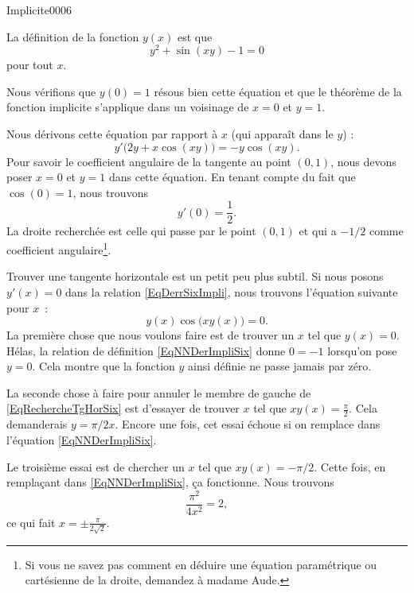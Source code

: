 
\begin{corrige}{Implicite0006}

	La définition de la fonction $y(x)$ est que 
	\begin{equation}		\label{EqNNDerImpliSix}
		y^2+\sin(xy)-1=0
	\end{equation}
	pour tout $x$.
	
	Nous vérifions que $y(0)=1$ résous bien cette équation et que le théorème de la fonction implicite s'applique dans un voisinage de $x=0$ et $y=1$.
	
	Nous dérivons cette équation par rapport à $x$ (qui apparaît dans le $y$) :
	\begin{equation}		\label{EqDerrSixImpli}
		y'\big( 2y+x\cos(xy) \big)=-y\cos(xy).
	\end{equation}
	Pour savoir le coefficient angulaire de la tangente au point $(0,1)$, nous devons poser $x=0$ et $y=1$ dans cette équation. En tenant compte du fait que $\cos(0)=1$, nous trouvons
	\begin{equation}
		y'(0)=\frac{1}{ 2 }.
	\end{equation}
	La droite recherchée est celle qui passe par le point $(0,1)$ et qui a $-1/2$ comme coefficient angulaire\footnote{Si vous ne savez pas comment en déduire une équation paramétrique ou cartésienne de la droite, demandez à madame Aude.}.

	Trouver une tangente horizontale est un petit peu plus subtil. Si nous posons $y'(x)=0$ dans la relation \eqref{EqDerrSixImpli}, nous trouvons l'équation suivante pour $x$~:
	\begin{equation}		\label{EqRechercheTgHorSix}
		y(x)\cos\big( xy(x) \big)=0.
	\end{equation}
	La première chose que nous voulons faire est de trouver un $x$ tel que $y(x)=0$. Hélas, la relation de définition \eqref{EqNNDerImpliSix} donne $0=-1$ lorsqu'on pose $y=0$. Cela montre que la fonction $y$ ainsi définie ne passe jamais par zéro.

	La seconde chose à faire pour annuler le membre de gauche de \eqref{EqRechercheTgHorSix} est d'essayer de trouver $x$ tel que $xy(x)=\frac{ \pi }{ 2 }$. Cela demanderais $y=\pi/2x$. Encore une fois, cet essai échoue si on remplace dans l'équation \eqref{EqNNDerImpliSix}.

	Le troisième essai est de chercher un $x$ tel que $xy(x)=-\pi/2$. Cette fois, en remplaçant dans \eqref{EqNNDerImpliSix}, ça fonctionne. Nous trouvons
	\begin{equation}
		\frac{ \pi^2 }{ 4x^2 }=2, 
	\end{equation}
	ce qui fait $x=\pm\frac{ \pi }{ 2\sqrt{2} }$.


\end{corrige}
